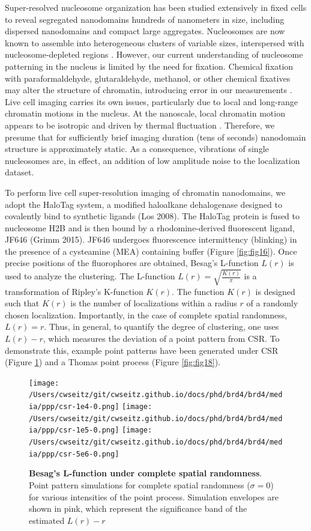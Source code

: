 Super-resolved nucleosome organization has been studied extensively in fixed cells to reveal segregated
nanodomains hundreds of nanometers in size, including dispersed nanodomains and compact large aggregates. Nucleosomes are now known to assemble into heterogeneous clusters of variable sizes, interspersed with nucleosome-depleted regions \parencite{Ricci2015}. However, our current understanding of nucleosome patterning in the nucleus is limited by the need for fixation. Chemical fixation with paraformaldehyde, glutaraldehyde, methanol, or other chemical fixatives may alter the structure of chromatin, introducing error in our measurements \parencite{Maeshima2020}. Live cell imaging carries its own issues, particularly due to local and long-range chromatin motions in the nucleus. At the nanoscale, local chromatin motion appears to be isotropic and driven by thermal fluctuation \parencite{Maeshima2020}. Therefore, we presume that for sufficiently brief imaging duration (tens of seconds) nanodomain structure is approximately static. As a consequence, vibrations of single nucleosomes are, in effect, an addition of low amplitude noise to the localization dataset. 

To perform live cell super-resolution imaging of chromatin nanodomains, we adopt the HaloTag system, a modified haloalkane dehalogenase designed to covalently bind to synthetic ligands (Los 2008). The HaloTag protein is fused to nucleosome H2B and is then bound by a rhodomine-derived fluorescent ligand, JF646 (Grimm 2015). JF646 undergoes fluorescence intermittency (blinking) in the presence of a cysteamine (MEA) containing buffer (Figure \ref{fig:fig16}). Once precise positions of the fluorophores are obtained, Besag’s L-function $L(r)$ is used to analyze the clustering. The L-function $L(r)= \sqrt{\frac{K(r)}{\pi}}$ is a transformation of Ripley’s K-function $K(r)$. The function $K(r)$ is designed such that $K(r)$ is the number of localizations within a radius $r$ of a randomly chosen localization. Importantly, in the case of complete spatial randomness, $L(r)=r$. Thus, in general, to quantify the degree of clustering, one uses $L(r)-r$, which measures the deviation of a point pattern from CSR. To demonstrate this, example point patterns have been generated under CSR (Figure \ref{fig:fig17}) and a Thomas point process (Figure \ref{fig:fig18}).


\begin{figure}
\centering
\texttt{[image: /Users/cwseitz/git/cwseitz.github.io/docs/phd/brd4/brd4/media/ppp/csr-1e4-0.png]}
\texttt{[image: /Users/cwseitz/git/cwseitz.github.io/docs/phd/brd4/brd4/media/ppp/csr-1e5-0.png]}
\texttt{[image: /Users/cwseitz/git/cwseitz.github.io/docs/phd/brd4/brd4/media/ppp/csr-5e6-0.png]}
\caption{\textbf{Besag's L-function under complete spatial randomness}. Point pattern simulations for complete spatial randomness ($\sigma=0$) for various intensities of the point process. Simulation envelopes are shown in pink, which represent the significance band of the estimated $L(r)-r$}
\label{fig:fig17}
\end{figure}

